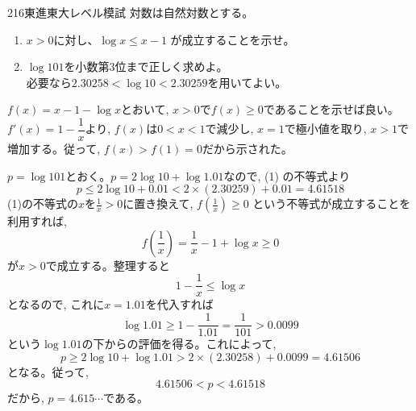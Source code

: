 \begin{thm}{216}{}{東進東大レベル模試}
 対数は自然対数とする。
 \begin{enumerate}
  \item $x>0$に対し、$\log x \le x-1$ が成立することを示せ。
  \item $\log 101$を小数第3位まで正しく求めよ。 \\ 必要なら$2.30258<\log 10 <2.30259$を用いてよい。
 \end{enumerate}
\end{thm}

$f(x)=x-1- \log{x} $とおいて, $x>0$で$f(x)\geq 0$であることを示せば良い。$f'(x) = 1- \dfrac{1}{x}$より, $f(x)$は$0<x<1$で減少し, $x=1$で極小値を取り, $x>1$で増加する。従って, $f(x)>f(1) = 0$だから示された。

$p=\log{101}$とおく。$p=2\log{10}+\log{1.01}$なので, (1) の不等式より
\[ p\leq 2\log{10}+ 0.01 < 2\times (2.30259) + 0.01 = 4.61518 \]
(1)の不等式の$x$を$\frac{1}{x}>0$に置き換えて, $f(\frac{1}{x})\geq 0$ という不等式が成立することを利用すれば, 
\[ f(\frac{1}{x})= \dfrac{1}{x}- 1 + \log{x} \geq 0 \]
が$x>0$で成立する。整理すると
\[ 1-\dfrac{1}{x}\leq \log{x} \]
となるので, これに$x=1.01$を代入すれば
\[ \log{1.01} \geq 1- \dfrac{1}{1.01} = \dfrac{1}{101} > 0.0099 \]
という$\log{1.01}$の下からの評価を得る。これによって, 
\[ p \geq 2\log{10} + \log{1.01}  > 2\times (2.30258) + 0.0099 =4.61506 \]
となる。従って,
\[ 4.61506 < p < 4.61518 \]
だから, $p= 4.615\cdots $である。
